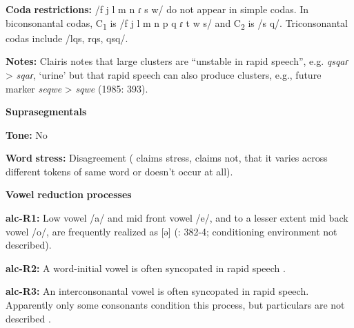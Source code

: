 \begin{styleBody}
\textbf{Coda} \textbf{restrictions:} /f j l m n ɾ s w/ do not appear in simple codas. In biconsonantal codas, C\textsubscript{1} is /f j l m n p q ɾ t w s/ and C\textsubscript{2} is /s q/. Triconsonantal codas include /lqs, rqs, qsq/.
\end{styleBody}

\begin{styleBody}
\textbf{Notes:} Clairis notes that large clusters are “unstable in rapid speech”, e.g. \textit{qsqaɾ} > \textit{sqaɾ}, ‘urine’ but that rapid speech can also produce clusters, e.g., future marker \textit{seqwe} > \textit{sqwe} (1985: 393).
\end{styleBody}

\begin{styleBody}
\textbf{Suprasegmentals}
\end{styleBody}

\begin{styleBody}
\textbf{Tone:} No
\end{styleBody}

\begin{styleBody}
\textbf{Word} \textbf{stress:} Disagreement (\citealt{Clairis1977} claims stress, \citealt{Clairis1985} claims not, that it varies across different tokens of same word or doesn’t occur at all).
\end{styleBody}

\begin{styleBody}
\textbf{Vowel} \textbf{reduction} \textbf{processes}
\end{styleBody}

\begin{styleBody}
\textbf{alc-R1:} Low vowel /a/ and mid front vowel /e/, and to a lesser extent mid back vowel /o/, are frequently realized as [ə] (\citealt{Clairis1985}: 382-4; conditioning environment not described).
\end{styleBody}

\begin{styleBody}
\textbf{alc-R2:} A word-initial vowel is often syncopated in rapid speech \citep[393]{Clairis1985}.
\end{styleBody}

\begin{styleBody}
\textbf{alc-R3:} An interconsonantal vowel is often syncopated in rapid speech. Apparently only some consonants condition this process, but particulars are not described \citep[393]{Clairis1985}.
\end{styleBody}


